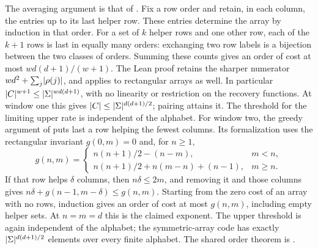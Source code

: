 \begin{outline}
The averaging argument is that of \cite[Proposition~6.24(d)]{SeventeenthPaper2026}. Fix a row order and retain, in
each column, the entries up to its last helper row. These entries determine the array by induction in that order.
For a set of $k$ helper rows and one other row, each of the $k+1$ rows is last in equally many orders: exchanging
two row labels is a bijection between the two classes of orders. Summing these counts gives an order of cost at most
$wd(d+1)/(w+1)$. The Lean proof retains the sharper numerator $wd^2+\sum_j\lvert \rho(j) \rvert$, and applies to rectangular
arrays as well. In particular
$\lvert C \rvert^{w+1}\le\lvert \Sigma \rvert^{wd(d+1)}$, with no linearity or restriction on the recovery functions.
At window one this gives $\lvert C \rvert\le\lvert \Sigma \rvert^{d(d+1)/2}$; pairing attains it. The threshold for the limiting
upper rate is independent of the alphabet. For window two, the greedy argument of
\cite[Proposition~6.22(b)]{SeventeenthPaper2026} puts last a row helping the fewest columns. Its formalization uses
the rectangular invariant $g(0,m)=0$ and, for $n\ge1$,
\[
g(n,m)=
\begin{cases}
n(n+1)/2-(n-m),&m<n,\\
n(n+1)/2+n(m-n)+(n-1),&m\ge n.
\end{cases}
\]
If that row helps $\delta$ columns, then $n\delta\le2m$, and removing it and those columns gives
$n\delta+g(n-1,m-\delta)\le g(n,m)$. Starting from the zero cost of an array with no rows, induction gives an order
of cost at most $g(n,m)$, including empty helper sets. At $n=m=d$ this is the claimed exponent. The upper threshold
is again independent of the alphabet;
the symmetric-array code has exactly $\lvert \Sigma \rvert^{d(d+1)/2}$ elements over every finite alphabet.
The shared order theorem is .
\end{outline}

